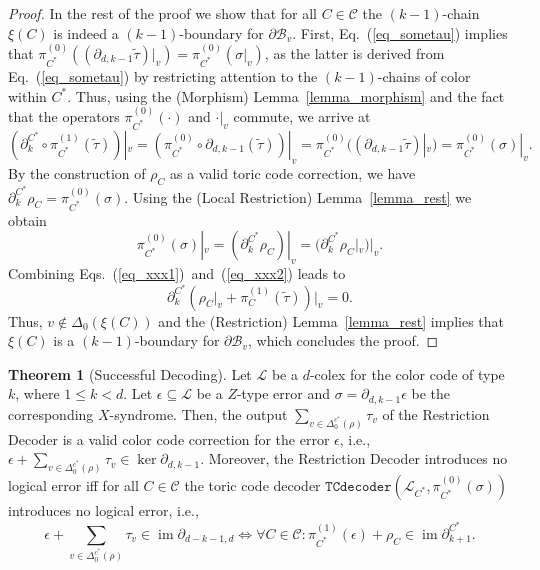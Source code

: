 \documentclass[onecolumn,letterpaper,11pt,accepted=2022-12-19]{quantumarticle}
\newcommand{\face}[2]{{\Delta_{#1}(#2)}}
\newcommand{\facex}[3]{{\Delta^{#1}_{#2}(#3)}}
\DeclareMathOperator{\im}{im}
\newcommand{\bnd}[2]{\partial_{#1,#2}}
\newcommand{\rest}[1]{|_{#1}}
\theoremstyle{definition}
\theoremstyle{lemma}
\newtheorem{theorem}{Theorem}
\theoremstyle{theorem}
\theoremstyle{corollary}
\begin{document}
{\begin{proof}
In the rest of the proof we show that for all $C\in\mathcal{C}$ the $(k-1)$-chain $\xi(C)$ is indeed a $(k-1)$-boundary for $\partial\mathcal{B}_v$.
First, Eq.~(\ref{eq_sometau}) implies that $\pi^{(0)}_{C^*}((\bnd d {k-1} \widetilde\tau)\rest v) = \pi^{(0)}_{C^*}(\sigma\rest v)$, as the latter is derived from Eq.~(\ref{eq_sometau}) by restricting attention to the $(k-1)$-chains of color within $C^*$.
Thus, using the (Morphism) Lemma~\ref{lemma_morphism} and the fact that the operators $\pi^{(0)}_{C^*}(\cdot)$ and $\cdot\rest v$ commute, we arrive at
\begin{equation}
\label{eq_xxx1}
\left(\partial_k^{C^*}\circ \pi^{(1)}_{C^*}(\widetilde\tau)\right)\rest v
=  \left(\pi^{(0)}_{C^*}\circ \bnd d {k-1} (\widetilde\tau)\right)\rest v
= \pi^{(0)}_{C^*}(( \bnd d {k-1} \widetilde\tau)\rest v)= \pi^{(0)}_{C^*}(\sigma)\rest v.
\end{equation}
By the construction of $\rho_C$ as a valid toric code correction, we have $\partial_k^{C^*}\rho_C = \pi_{C^*}^{(0)}(\sigma)$.
Using the (Local Restriction) Lemma~\ref{lemma_rest} we obtain
\begin{equation}
\label{eq_xxx2}
\pi^{(0)}_{C^*}(\sigma)\rest v = (\partial_k^{C^*} \rho_C)\rest v = (\partial_k^{C^*} \rho_C\rest v)\rest v.
\end{equation}
Combining Eqs.~(\ref{eq_xxx1})~and~(\ref{eq_xxx2}) leads to
\begin{equation}
\partial_k^{C^*}\left(\rho_C\rest v + \pi^{(1)}_C(\widetilde\tau)\right)\rest v = 0.
\end{equation}
Thus, $v\not\in\face 0 {\xi(C)}$ and the (Restriction) Lemma~\ref{lemma_rest} implies that $\xi(C)$ is a $(k-1)$-boundary for $\partial\mathcal{B}_v$, which concludes the proof.
\end{proof}



\begin{theorem}[Successful Decoding]
\label{thm_success}
Let $\mathcal{L}$ be a $d$-colex for the color code of type $k$, where $1\leq k < d$.
Let $\epsilon\subseteq \mathcal{L}$ be a $Z$-type error and $\sigma = \bnd d {k-1}\epsilon$ be the corresponding $X$-syndrome.
Then, the output $\sum_{v\in \facex {c^*} 0 \rho} \tau_v$ of the Restriction Decoder is a valid color code correction for the error $\epsilon$, i.e.,
 $\epsilon + \sum_{v\in \facex {c^*} 0 \rho} \tau_v \in \ker \bnd d {k-1}$.
Moreover, the Restriction Decoder introduces no logical error iff for all $C\in\mathcal{C}$ the toric code decoder
${\mathtt{TCdecoder}(\mathcal{L}_{C^*}, \pi^{(0)}_{C^*}(\sigma))}$ introduces no logical error, i.e.,
\begin{equation}
\label{eq_equivalence}
\epsilon + \sum_{v\in \facex {c^*} 0 \rho} \tau_v \in \im \bnd {d-k-1} d \iff \forall C\in\mathcal{C}: \pi_{C^*}^{(1)}(\epsilon) + \rho_C \in \im\partial_{k+1}^{C^*}.
\end{equation}
\end{theorem}


}
\end{document}
